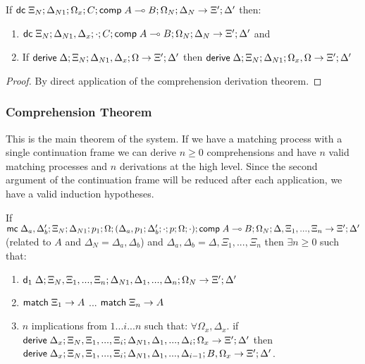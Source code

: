 \begin{lemma}
If $\mathsf{dc} \; \Xi_N; \Delta_{N1}; \Omega_x; C; \mathsf{comp} \; A \multimap B; \Omega_N; \Delta_N \rightarrow \Xi'; \Delta'$ then:
\begin{enumerate}
   \item $\mathsf{dc} \; \Xi_N; \Delta_{N1}, \Delta_x; \cdot; C; \mathsf{comp} \; A \multimap B; \Omega_N; \Delta_N \rightarrow \Xi'; \Delta'$ and
   \item If $\mathsf{derive} \; \Delta; \Xi_N; \Delta_{N1}, \Delta_x; \Omega \rightarrow \Xi'; \Delta'$ then $\mathsf{derive} \; \Delta; \Xi_N; \Delta_{N1}; \Omega_x, \Omega \rightarrow \Xi'; \Delta'$
\end{enumerate}
\end{lemma}

\begin{proof}
   By direct application of the comprehension derivation theorem.
\end{proof}

\subsubsection{Comprehension Theorem}

This is the main theorem of the system. If we have a matching process with a single continuation frame we can derive $n \geq 0$ comprehensions and have $n$ valid matching processes and $n$ derivations at the high level.
Since the second argument of the continuation frame will be reduced after each application, we have a valid induction hypotheses.

\begin{theorem}
If $\mathsf{mc} \; \Delta_a, \Delta'_b; \Xi_N; \Delta_{N1}; p_1; \Omega; (\Delta_a, p_1; \Delta'_b; \cdot; p; \Omega; \cdot); \mathsf{comp} \; A \multimap B; \Omega_N; \Delta, \Xi_1, ..., \Xi_n \rightarrow \Xi'; \Delta'$ (related to $A$ and $\Delta_N = \Delta_a, \Delta_b$) and $\Delta_a, \Delta_b = \Delta, \Xi_1, ..., \Xi_n$ then $\exists n \geq 0$ such that:
\begin{enumerate}
   \item $\mathsf{d}_1 \; \Delta; \Xi_N, \Xi_1, ..., \Xi_n; \Delta_{N1}, \Delta_1, ..., \Delta_n; \Omega_N \rightarrow \Xi'; \Delta'$
   \item $\mathsf{match} \; \Xi_1 \rightarrow A$ ... $\mathsf{match} \; \Xi_n \rightarrow A$
   \item $n$ implications from $1 ... i ... n$ such that: $\forall \Omega_x, \Delta_x.$ if $\mathsf{derive} \; \Delta_x; \Xi_N, \Xi_1, ..., \Xi_i; \Delta_{N1}, \Delta_1, ..., \Delta_i; \Omega_x \rightarrow \Xi'; \Delta'$ then $\mathsf{derive} \; \Delta_x; \Xi_N, \Xi_1, ..., \Xi_i; \Delta_{N1}, \Delta_1, ..., \Delta_{i-1}; B, \Omega_x \rightarrow \Xi'; \Delta'$.
\end{enumerate}
\end{theorem}

